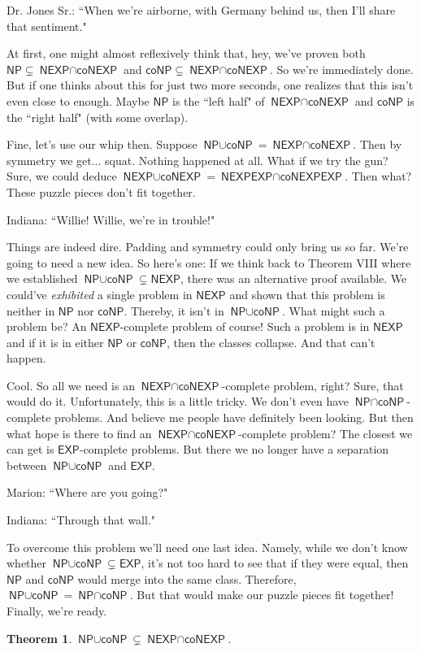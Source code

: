 \documentclass{article}
\newtheorem{theorem}{Theorem}
\newcommand{\EXP}{\ensuremath{\textsf{EXP}}}
\newcommand{\NP}{\ensuremath{\textsf{NP}}}
\newcommand{\NEXP}{\ensuremath{\textsf{NEXP}}}
\newcommand{\coNP}{\ensuremath{\textsf{coNP}}}
\newcommand{\interP}{\ensuremath{\textsf{NP}\cap\textsf{coNP}}}
\newcommand{\interEXP}{\ensuremath{\textsf{NEXP}\cap\textsf{coNEXP}}}
\newcommand{\interEXPEXP}{\ensuremath{\textsf{NEXPEXP}\cap\textsf{coNEXPEXP}}}
\newcommand{\unionP}{\ensuremath{\textsf{NP}\cup\textsf{coNP}}}
\newcommand{\unionEXP}{\ensuremath{\textsf{NEXP}\cup\textsf{coNEXP}}}
\begin{document}
Dr. Jones Sr.: ``When we're airborne, with Germany behind us, then I'll share that sentiment."

At first, one might almost reflexively think that, hey, we've proven both $\NP \subsetneq \interEXP$ and $\coNP \subsetneq \interEXP$. So we're immediately done. But if one thinks about this for just two more seconds, one realizes that this isn't even close to enough. Maybe $\NP$ is the ``left half" of $\interEXP$ and $\coNP$ is the ``right half" (with some overlap).

Fine, let's use our whip then. Suppose $\unionP = \interEXP$. Then by symmetry we get... squat. Nothing happened at all. What if we try the gun? Sure, we could deduce $\unionEXP = \interEXPEXP$. Then what? These puzzle pieces don't fit together.

Indiana: ``Willie! Willie, we're in trouble!"

Things are indeed dire. Padding and symmetry could only bring us so far. We're going to need a new idea. So here's one: If we think back to Theorem VIII where we established $\unionP \subsetneq \NEXP$, there was an alternative proof available. We could've \textit{exhibited} a single problem in $\NEXP$ and shown that this problem is neither in $\NP$ nor $\coNP$. Thereby, it isn't in $\unionP$. What might such a problem be? An $\NEXP$-complete problem of course! Such a problem is in $\NEXP$ and if it is in either $\NP$ or $\coNP$, then the classes collapse. And that can't happen.

Cool. So all we need is an $\interEXP$-complete problem, right? Sure, that would do it. Unfortunately, this is a little tricky. We don't even have $\interP$-complete problems. And believe me people have definitely been looking. But then what hope is there to find an $\interEXP$-complete problem? The closest we can get is $\EXP$-complete problems. But there we no longer have a separation between $\unionP$ and $\EXP$.

Marion: ``Where are you going?"

Indiana: ``Through that wall."

To overcome this problem we'll need one last idea. Namely, while we don't know whether $\unionP \subsetneq \EXP$, it's not too hard to see that if they were equal, then $\NP$ and $\coNP$ would merge into the same class. Therefore, $\unionP = \interP$. But that would make our puzzle pieces fit together! Finally, we're ready.

\begin{theorem}
$\unionP \subsetneq \interEXP$.
\end{theorem}
\end{document}
